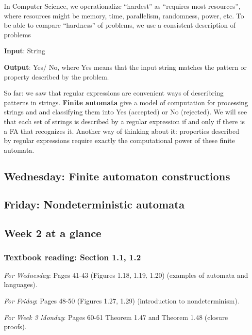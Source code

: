 In Computer Science, we operationalize ``hardest'' as ``requires most resources'', where
resources might be memory, time, parallelism, randomness, power, etc.
To be able to compare ``hardness'' of problems, we use a consistent description of problems

{\bf Input}: String

{\bf Output}: Yes/ No, where Yes means that the input string matches the pattern or property described by the problem.

So far: we saw that regular expressions are convenient ways of describring patterns in strings.
{\bf Finite automata} give a model of computation for processing strings and and classifying them into Yes (accepted)
or No (rejected). We will see that each set of strings is described by a regular expression if and only 
if there is a FA that recognizes it.  Another way of thinking about it: properties described by regular
expressions require exactly the computational power of these finite automata.


\subsection*{Wednesday: Finite automaton constructions}




\newpage
\subsection*{Friday: Nondeterministic automata}





\newpage
\subsection*{Week 2 at a glance}

\subsubsection*{Textbook reading: Section 1.1, 1.2}

{\it For Wednesday}: Pages 41-43 (Figures 1.18, 1.19, 1.20) (examples of automata and languages).

{\it For Friday}: Pages 48-50 (Figures 1.27, 1.29) (introduction to nondeterminism).

{\it For Week 3 Monday}: Pages 60-61 Theorem 1.47 and Theorem 1.48 (closure proofs).


